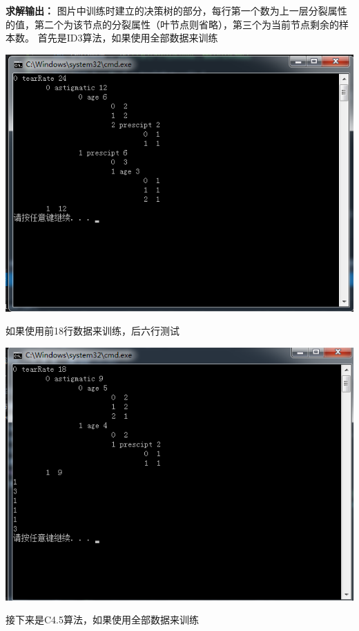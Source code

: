 \documentclass[12pt,a4paper]{article}
\theoremstyle{definition}
\begin{document}
\textbf{求解输出：}
	图片中训练时建立的决策树的部分，每行第一个数为上一层分裂属性的值，第二个为该节点的分裂属性（叶节点则省略），第三个为当前节点剩余的样本数。
	首先是ID3算法，如果使用全部数据来训练
	\begin{center}
		\includegraphics[width=\textwidth]{ID3all2train.png}
	\end{center}
	如果使用前18行数据来训练，后六行测试
	\begin{center}
		\includegraphics[width=\textwidth]{ID18toTrain.png}
	\end{center}
	接下来是C4.5算法，如果使用全部数据来训练
\end{document}
